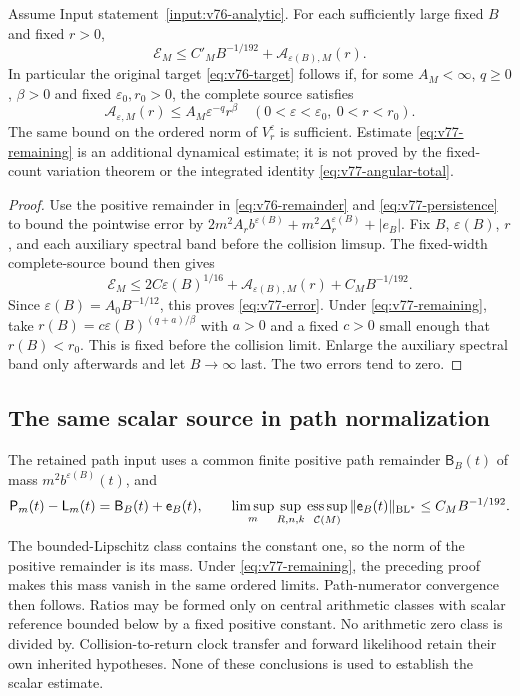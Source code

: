 \begin{theorem}
\label{thm:v77-closure}
Assume Input statement~\ref{input:v76-analytic}. For each sufficiently
large fixed $B$ and fixed $r>0$,
\begin{equation}\label{eq:v77-error}
 \mathcal E_M\le C'_M B^{-1/192}
                    +\mathcal A_{\varepsilon(B),M}(r).
\end{equation}
In particular the original target \eqref{eq:v76-target} follows if,
for some $A_M<\infty$, $q\ge0$, $\beta>0$ and fixed
$\varepsilon_0,r_0>0$, the complete source satisfies
\begin{equation}\label{eq:v77-remaining}
 \mathcal A_{\varepsilon,M}(r)
       \le A_M\varepsilon^{-q}r^\beta
       \quad(0<\varepsilon<\varepsilon_0,\ 0<r<r_0).
\end{equation}
The same bound on the ordered norm of $V_r^\varepsilon$ is sufficient.
Estimate \eqref{eq:v77-remaining} is an additional dynamical estimate;
it is not proved by the fixed-count variation theorem or the
integrated identity \eqref{eq:v77-angular-total}.
\end{theorem}
\begin{proof}
Use the positive remainder in \eqref{eq:v76-remainder} and
\eqref{eq:v77-persistence} to bound the pointwise error by
$2m^2A_r b^{\varepsilon(B)}+m^2\Delta_r^{\varepsilon(B)}+|e_B|$.
Fix $B$, $\varepsilon(B)$, $r$, and each auxiliary spectral band
before the collision limsup. The fixed-width complete-source bound
then gives
\[
 \mathcal E_M\le 2C\varepsilon(B)^{1/16}
                 +\mathcal A_{\varepsilon(B),M}(r)+C_MB^{-1/192}.
\]
Since $\varepsilon(B)=A_0B^{-1/12}$, this proves
\eqref{eq:v77-error}. Under \eqref{eq:v77-remaining}, take
$r(B)=c\varepsilon(B)^{(q+a)/\beta}$ with $a>0$ and a fixed
$c>0$ small enough that $r(B)<r_0$. This is fixed before the
collision limit. Enlarge the auxiliary spectral band only afterwards
and let $B\to\infty$ last. The two errors tend to zero.
\end{proof}

\subsection{The same scalar source in path normalization}
The retained path input uses a common finite positive path remainder
$\mathsf B_B(t)$ of mass $m^2b^{\varepsilon(B)}(t)$, and
\[
 \mathsf P_m(t)-\mathsf L_m(t)=\mathsf B_B(t)+\mathsf e_B(t),
 \qquad\limsup_m\sup_{R,n,k}\operatorname*{ess\,sup}_{\mathcal C(M)}
       \|\mathsf e_B(t)\|_{\mathrm{BL}^*}\le C_MB^{-1/192}.
\]
The bounded-Lipschitz class contains the constant one, so the norm of
the positive remainder is its mass. Under
\eqref{eq:v77-remaining}, the preceding proof makes this mass vanish
in the same ordered limits. Path-numerator convergence then follows.
Ratios may be formed only on central arithmetic classes with scalar
reference bounded below by a fixed positive constant. No arithmetic
zero class is divided by. Collision-to-return clock transfer and
forward likelihood retain their own inherited hypotheses. None of
these conclusions is used to establish the scalar estimate.
